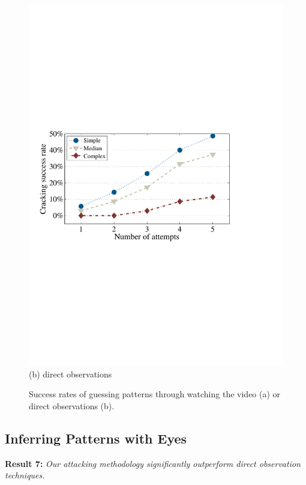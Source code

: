 \begin{figure}[!t]
{\begin{minipage}[t]{0.45\textwidth}
                \includegraphics[width=\textwidth]{fig/look-finger.pdf}\\
                \centering \footnotesize (b) direct observations
                \end{minipage}
            }
            \vspace{-2mm}
            \caption{Success rates of guessing patterns through watching the video (a) or direct observations (b).}
            \label{fig:look-unlocking process}
        \end{figure}

    \subsection{Inferring Patterns with Eyes}

    \noindent \textbf{Result 7:} \emph{Our attacking methodology significantly outperform direct observation techniques.}

